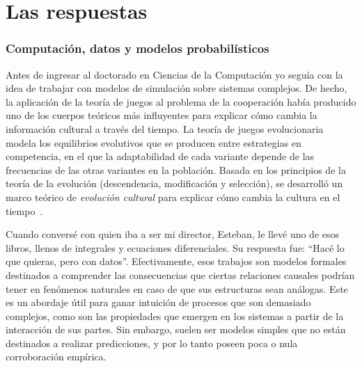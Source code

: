 \documentclass[a4paper,11pt]{book}
\theoremstyle{definition}
\begin{document}

\section{Las respuestas}


\subsubsection{Computaci\'on, datos y modelos probabil\'isticos}

Antes de ingresar al doctorado en Ciencias de la Computaci\'on yo segu\'ia con la idea de trabajar con modelos de simulaci\'on sobre sistemas complejos.
%
De hecho, la aplicaci\'on de la teor\'ia de juegos al problema de la cooperaci\'on hab\'ia producido uno de los cuerpos te\'oricos m\'as influyentes  para explicar c\'omo cambia la informaci\'on cultural a trav\'es del tiempo.
%
La teor\'ia de juegos evolucionaria \cite{taylor1978-replicatorDynamic, maynardSmith1982-evolutionGameTheory} modela los equilibrios evolutivos que se producen entre estrategias en competencia, en el que la adaptabilidad de cada variante depende de las frecuencias de las otras variantes en la poblaci\'on.
%
Basada en los principios de la teor\'ia de la evoluci\'on (descendencia, modificaci\'on y selecci\'on), se desarroll\'o un marco te\'orico de \emph{evoluci\'on cultural} para explicar c\'omo cambia la cultura en el tiempo~\cite{boyd1985-evolutionaryProcess, boyd2005-origin}.


Cuando convers\'e con quien iba a ser mi director, Esteban, le llev\'e uno de esos libros, llenos de integrales y ecuaciones diferenciales.
%
Su respuesta fue: ``Hac\'e lo que quieras, pero con datos''.
%
Efectivamente, esos trabajos son modelos formales destinados a comprender las consecuencias que ciertas relaciones causales podr\'ian tener en fen\'omenos naturales en caso de que sus estructuras sean an\'alogas.
%
Este es un abordaje \'util para ganar intuici\'on de procesos que son demasiado complejos, como son las propiedades que emergen en los sistemas a partir de la interacci\'on de sus partes.
%
Sin embargo, suelen ser modelos simples que no est\'an destinados a realizar predicciones, y por lo tanto poseen poca o nula corroboraci\'on emp\'irica.
\end{document}
